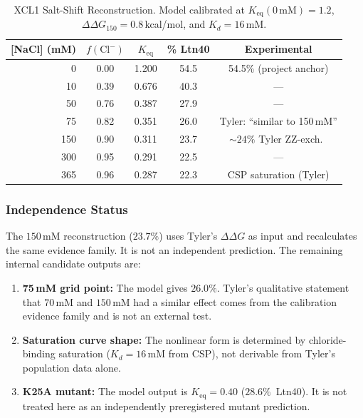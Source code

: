 \documentclass[12pt,a4paper]{article}
\begin{document}
\begin{table}[!htbp]
\centering
\caption{XCL1 Salt-Shift Reconstruction. Model calibrated at
$K_\text{eq}(0\,\text{mM}) = 1.2$, $\Delta\Delta G_{150} = 0.8$\,kcal/mol,
and $K_d = 16$\,mM.}
\label{tab:xcl1_salt}
\begin{tabular}{@{}rcccc@{}}
\toprule
{[NaCl]} (mM) & $f(\text{Cl}^-)$ & $K_\text{eq}$ & \% Ltn40 & Experimental \\
\midrule
0   & 0.00 & 1.200 & 54.5 & 54.5\% (project anchor) \\
10  & 0.39 & 0.676 & 40.3 & --- \\
50  & 0.76 & 0.387 & 27.9 & --- \\
75  & 0.82 & 0.351 & 26.0 & Tyler: ``similar to 150\,mM''  \\
150 & 0.90 & 0.311 & 23.7 & ${\sim}24\%$ Tyler ZZ-exch.\  \\
300 & 0.95 & 0.291 & 22.5 & --- \\
365 & 0.96 & 0.287 & 22.3 & CSP saturation (Tyler) \\
\bottomrule
\end{tabular}
\end{table}

\subsubsection{Independence Status}

The $150$\,mM reconstruction ($23.7\%$) uses Tyler's
$\Delta\Delta G$ as input and recalculates the same evidence family.
It is not an independent prediction. The remaining internal candidate
outputs are:

\begin{enumerate}
  \item \textbf{75\,mM grid point:} The model gives $26.0\%$. Tyler's
    qualitative statement that $70$\,mM and $150$\,mM had a similar
    effect comes from the calibration evidence family and is not an
    external test.
  \item \textbf{Saturation curve shape:} The nonlinear form is
    determined by chloride-binding saturation ($K_d = 16$\,mM from CSP),
    not derivable from Tyler's population data alone.
  \item \textbf{K25A mutant:} The model output is
    $K_\text{eq} = 0.40$ ($28.6\%$~Ltn40). It is not treated here as an
    independently preregistered mutant prediction.
\end{enumerate}


\end{document}
